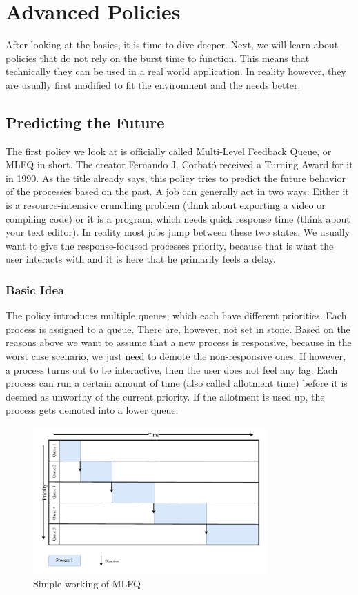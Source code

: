 \chapter{Advanced Policies}
After looking at the basics, it is time to dive deeper. Next, we will learn about policies that do not rely on the burst time to function. This means that technically they can be used in a real world application. In reality however, they are usually first modified to fit the environment and the needs better.

\section{Predicting the Future}


The first policy we look at is officially called Multi-Level Feedback Queue, or MLFQ in short. The creator Fernando J. Corbató received a Turning Award for it in 1990. 
As the title already says, this policy tries to predict the future behavior of the processes based on the past.
A job can generally act in two ways:
Either it is a resource-intensive crunching problem (think about exporting a video or compiling code) or it is a program, which needs quick response time (think about your text editor).
In reality most jobs jump between these two states.
We usually want to give the response-focused processes priority, because that is what the user interacts with and it is here that he primarily feels a delay.

\subsection{Basic Idea}

The policy introduces multiple queues, which each have different priorities.
Each process is assigned to a queue. There are, however, not set in stone.
Based on the reasons above we want to assume that a new process is responsive, because in the worst case scenario, we just need to demote the non-responsive ones.
If however, a process turns out to be interactive, then the user does not feel any lag. 
Each process can run a certain amount of time (also called allotment time) before it is deemed as unworthy of the current priority.
If the allotment is used up, the process gets demoted into a lower queue.

\begin{figure}[h]
    \centering
    \includegraphics[width=0.8\textwidth]{Assets/MLFQ-Example-1.pdf}
    \caption{Simple working of MLFQ}
    \label{fig:mlfq-example-1}
\end{figure}


